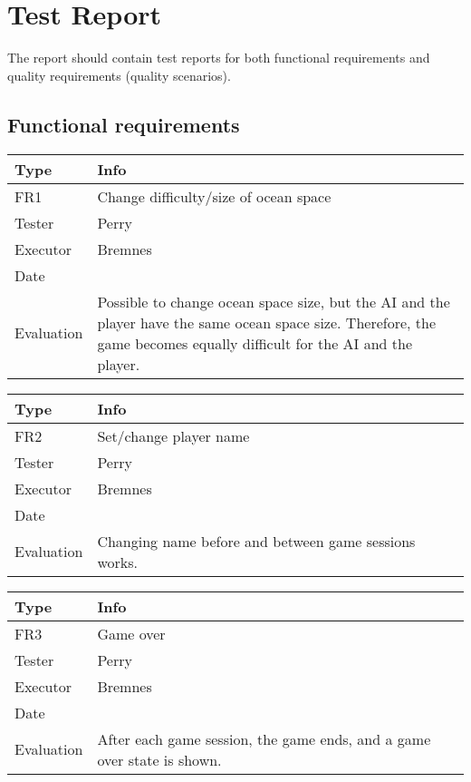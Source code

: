 \chapter{Test Report}

The report should contain test reports for both functional requirements and quality requirements (quality scenarios).

\section{Functional requirements}

\begin{tabular}{|p{2cm}|p{10cm}|}
	\hline
	\bf{Type}	& \bf{Info} \\
	\hline
	FR1			& Change difficulty/size of ocean space \\
	Tester		& Perry \\
	Executor	& Bremnes \\
	Date		& \date{\today} \\
	Evaluation	& Possible to change ocean space size, but the AI and the player have the same ocean space size. Therefore, the game becomes equally difficult for the AI and the player.\\
	\hline
\end{tabular}

\vspace{0.5em}

\noindent
\begin{tabular}{|p{2cm}|p{10cm}|}
	\hline
	\bf{Type}	& \bf{Info} \\
	\hline
	FR2			& Set/change player name \\
	Tester		& Perry \\
	Executor	& Bremnes \\
	Date		& \date{\today} \\
	Evaluation	& Changing name before and between game sessions works. \\
	\hline
\end{tabular}

\vspace{0.5em}

\noindent
\begin{tabular}{|p{2cm}|p{10cm}|}
	\hline
	\bf{Type}	& \bf{Info} \\
	\hline
	FR3			& Game over \\
	Tester		& Perry \\
	Executor	& Bremnes \\
	Date		& \date{\today} \\
	Evaluation	& After each game session, the game ends, and a game over state is shown. \\
	\hline
\end{tabular}

